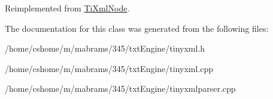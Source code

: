 \-Reimplemented from \hyperlink{class_ti_xml_node_a6a4c8ac28ee7a745d059db6691e03bae}{\-Ti\-Xml\-Node}.



\-The documentation for this class was generated from the following files\-:\begin{DoxyCompactItemize}
\item 
/home/cshome/m/mabrams/345/txt\-Engine/tinyxml.\-h\item 
/home/cshome/m/mabrams/345/txt\-Engine/tinyxml.\-cpp\item 
/home/cshome/m/mabrams/345/txt\-Engine/tinyxmlparser.\-cpp\end{DoxyCompactItemize}
